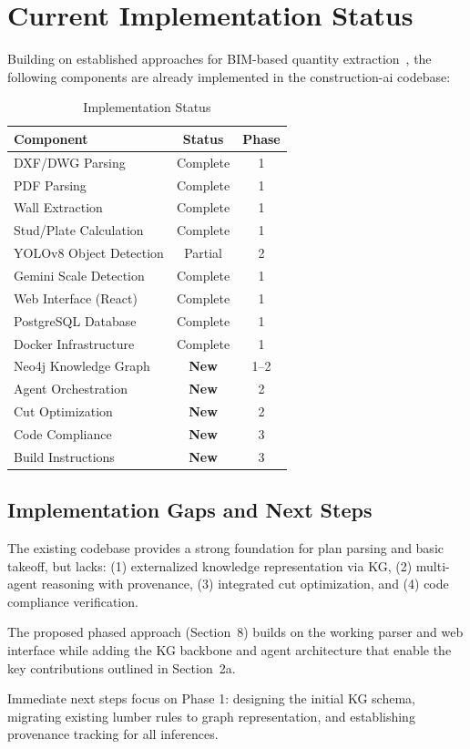 
\section{Current Implementation Status}

Building on established approaches for BIM-based quantity extraction~\cite{eastman2018bim, eldiraby2017bim_quantities}, the following components are already implemented in the construction-ai codebase:

\begin{table}[ht]
\centering
\caption{Implementation Status}
\label{tab:status}
\begin{tabular}{lcc}
\toprule
\textbf{Component} & \textbf{Status} & \textbf{Phase} \\
\midrule
DXF/DWG Parsing & Complete & 1 \\
PDF Parsing & Complete & 1 \\
Wall Extraction & Complete & 1 \\
Stud/Plate Calculation & Complete & 1 \\
YOLOv8 Object Detection & Partial & 2 \\
Gemini Scale Detection & Complete & 1 \\
Web Interface (React) & Complete & 1 \\
PostgreSQL Database & Complete & 1 \\
Docker Infrastructure & Complete & 1 \\
\midrule
Neo4j Knowledge Graph & \textbf{New} & 1--2 \\
Agent Orchestration & \textbf{New} & 2 \\
Cut Optimization & \textbf{New} & 2 \\
Code Compliance & \textbf{New} & 3 \\
Build Instructions & \textbf{New} & 3 \\
\bottomrule
\end{tabular}
\end{table}

\subsection{Implementation Gaps and Next Steps}

The existing codebase provides a strong foundation for plan parsing and basic takeoff, but lacks:
(1) externalized knowledge representation via KG,
(2) multi-agent reasoning with provenance,
(3) integrated cut optimization, and
(4) code compliance verification.

The proposed phased approach (Section~8) builds on the working parser and web interface while adding the KG backbone and agent architecture that enable the key contributions outlined in Section~2a.

Immediate next steps focus on Phase 1: designing the initial KG schema, migrating existing lumber rules to graph representation, and establishing provenance tracking for all inferences.
